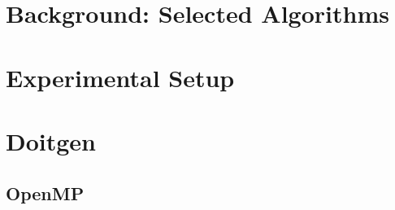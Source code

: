 \documentclass[letterpaper]{article}
\newcommand{\mypar}[1]{{\bf #1.}}
\begin{document}


\section{Background: Selected Algorithms}\label{sec:background}







\section{Experimental Setup}\label{sec:experimental_setup}


\section{Doitgen}\label{sec:doitgen}

\subsection{OpenMP}\label{sec:doitgenOpenMp}


\end{document}
